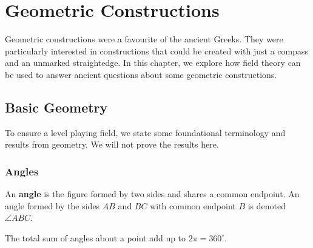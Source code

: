 \newcommand{\constructionproof}[6][0.7\textwidth]{
    \vspace{0.1cm}
    \begin{proof}[Construction]
        \renewcommand{\qedsymbol}{}
        \renewcommand\windowpagestuff{#3}
        \opencutright
        \begin{cutout}{0}{#1}{0pt}{#2}
                #4
        \end{cutout}
    \end{proof}
    \textbf{Claim}. {#5}
    \begin{proof}
        #6
    \end{proof}
}

\newcommand{\Con}{\mathfrak{C}}  %
\newcommand{\con}{\mathcal{C}}  %

\chapter{Geometric Constructions}
Geometric constructions were a favourite of the ancient Greeks. They were particularly interested in constructions that could be created with just a compass and an unmarked straightedge. In this chapter, we explore how field theory can be used to answer ancient questions about some geometric constructions.

\section{Basic Geometry}
To ensure a level playing field, we state some foundational terminology and results from geometry. We will not prove the results here.

\subsection{Angles}
\begin{definition}
    An \textbf{angle} is the figure formed by two sides and shares a common endpoint. An angle formed by the sides $AB$ and $BC$ with common endpoint $B$ is denoted $\angle ABC$.
\end{definition}

\begin{definition}
    The total sum of angles about a point add up to $2\pi = 360^\circ$.
\end{definition}


